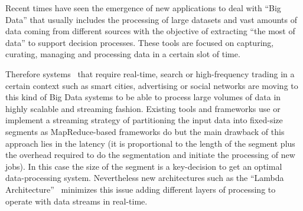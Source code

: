 Recent times have seen the emergence of new applications to deal with ``Big Data'' that usually 
includes the processing of large datasets and vast amounts of data coming from different sources 
with the objective of extracting ``the most of data'' to support decision processes. These tools 
are focused on capturing, curating, managing and processing data in a certain slot of time.



Therefore systems~\cite{BigDataComputing} that require real-time, search or high-frequency trading 
in a certain context such as smart cities, advertising or social networks are moving 
to this kind of Big Data systems to be able to process large 
volumes of data in highly scalable and streaming fashion. Existing tools 
and frameworks use or implement a streaming strategy of partitioning 
the input data into fixed-size segments as MapReduce-based frameworks do but
the main drawback of this approach lies in the latency (it is proportional to
the length of the segment plus the overhead required to do the segmentation and initiate
the processing of new jobs). In this case the size of the segment is a key-decision 
to get an optimal data-processing system. Nevertheless new architectures such 
as the ``Lambda Architecture''~\cite{BigDataManing} minimizes this issue adding different layers 
of processing to operate with data streams in real-time.

